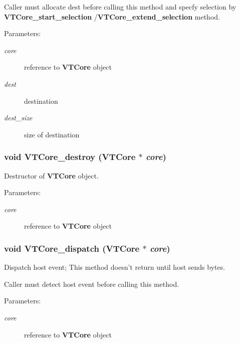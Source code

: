\par
 Caller must allocate dest before calling this method and specfy selection by {\bf VTCore\_\-start\_\-selection }/{\bf VTCore\_\-extend\_\-selection } method. \begin{Desc}
\item[Parameters:]
\begin{description}
\item[{\em core}]reference to {\bf VTCore} object \item[{\em dest}]destination \item[{\em dest\_\-size}]size of destination \end{description}
\end{Desc}
\subsubsection{\setlength{\rightskip}{0pt plus 5cm}void VTCore\_\-destroy ({\bf VTCore} $\ast$ {\em core})}\label{core_8h_a46}


Destructor of {\bf VTCore} object.

\begin{Desc}
\item[Parameters:]
\begin{description}
\item[{\em core}]reference to {\bf VTCore} object \end{description}
\end{Desc}
\subsubsection{\setlength{\rightskip}{0pt plus 5cm}void VTCore\_\-dispatch ({\bf VTCore} $\ast$ {\em core})}\label{core_8h_a63}


Dispatch host event; This method doesn't return until host sends bytes.

Caller must detect host event before calling this method. \begin{Desc}
\item[Parameters:]
\begin{description}
\item[{\em core}]reference to {\bf VTCore} object \end{description}
\end{Desc}

